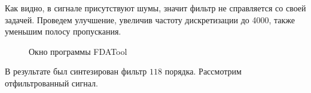 \documentclass[a4paper,14pt]{article}
\begin{document}
Как видно, в сигнале присутствуют шумы, значит фильтр не справляется со своей задачей. Проведем улучшение, увеличив частоту дискретизации до 4000, также уменьшим полосу пропускания.
\newpage
\begin{figure}[bh]
	\noindent{}
	\caption{Окно программы FDATool}
	\label{figCurves}
\end{figure}

\hspace{0,5cm}В результате был синтезирован фильтр $118$ порядка. Рассмотрим отфильтрованный сигнал.
\end{document}
